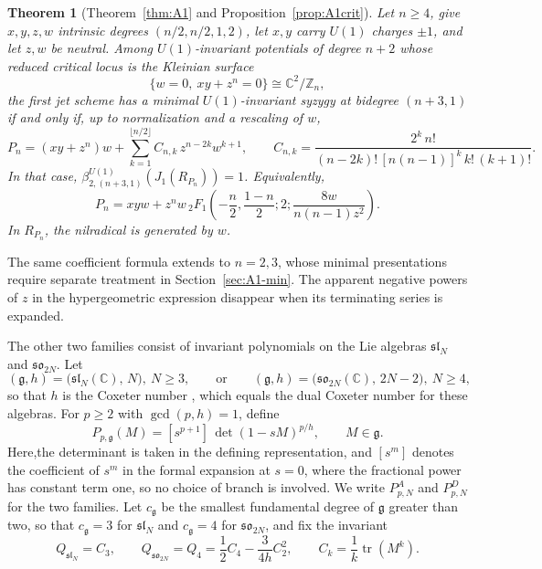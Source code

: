 \documentclass[10pt,reqno]{amsart}
\numberwithin{equation}{section}
\theoremstyle{plain}
\newtheorem{theorem}{Theorem}[section]
\theoremstyle{definition}
\DeclareMathOperator{\tr}{tr}
\begin{document}
\begin{theorem}[Theorem~\ref{thm:A1} and Proposition~\ref{prop:A1crit}]\label{thm:mainA}
Let $n\ge4$, give $x,y,z,w$ intrinsic degrees $(n/2,n/2,1,2)$, let $x,y$ carry $U(1)$ charges $\pm1$, and let $z,w$ be neutral. Among $U(1)$-invariant potentials of degree $n+2$ whose reduced critical locus is the Kleinian surface 
\begin{equation*}
    \{w=0,\ xy+z^n=0\}\cong\mathbb{C}^2/\mathbb{Z}_n, 
\end{equation*}
the first jet scheme has a minimal $U(1)$-invariant syzygy at bidegree $(n+3,1)$ if and only if, up to normalization and a rescaling of $w$,
\begin{equation*}
	P_n=(xy+z^n)w+\sum_{k=1}^{\lfloor n/2\rfloor}C_{n,k}\,z^{n-2k}w^{k+1},\qquad
	C_{n,k}=\frac{2^k\,n!}{(n-2k)!\,[n(n-1)]^k\,k!\,(k+1)!}.
\end{equation*}
In that case, $\beta^{U(1)}_{2,(n+3,1)}(J_1(R_{P_n}))=1$. Equivalently, 
\begin{equation*}
    P_n=xyw+z^nw\,{}_2F_1\left(-\frac n2,\frac{1-n}2;2;\frac{8w}{n(n-1)z^2}\right).
\end{equation*}
In $R_{P_n}$, the nilradical is generated by $w$.
\end{theorem}

The same coefficient formula extends to $n=2,3$, whose minimal presentations require separate treatment in Section~\ref{sec:A1-min}. The apparent negative powers of $z$ in the hypergeometric expression disappear when its terminating series is expanded.

The other two families consist of invariant polynomials on the Lie algebras $\mathfrak{sl}_N$ and $\mathfrak{so}_{2N}$. Let
\begin{equation}\label{eq:introgh}
	(\mathfrak{g},h)=\big(\mathfrak{sl}_N(\mathbb{C}),\,N\big),\ N\ge3,\qquad\text{or}\qquad (\mathfrak{g},h)=\big(\mathfrak{so}_{2N}(\mathbb{C}),\,2N-2\big),\ N\ge4,
\end{equation}
so that $h$ is the Coxeter number \cite{Humphreys}, which equals the dual Coxeter number for these algebras. For $p\ge2$ with $\gcd(p,h)=1$, define
\begin{equation}\label{eq:introP}
	P_{p,\mathfrak{g}}(M)=[s^{p+1}]\,\det(1-sM)^{p/h},\qquad M\in\mathfrak{g}.
\end{equation}
Here,the determinant is taken in the defining representation, and $[s^m]$ denotes the coefficient of $s^m$ in the formal expansion at $s=0$, where the fractional power has constant term one, so no choice of branch is involved. We write $P^A_{p,N}$ and $P^D_{p,N}$ for the two families. Let $c_\mathfrak{g}$ be the smallest fundamental degree of $\mathfrak{g}$ greater than two, so that $c_\mathfrak{g}=3$ for $\mathfrak{sl}_N$ and $c_\mathfrak{g}=4$ for $\mathfrak{so}_{2N}$, and fix the invariant
\begin{equation}\label{eq:introQ}
	Q_{\mathfrak{sl}_N}=C_3,\qquad Q_{\mathfrak{so}_{2N}}=Q_4=\frac12C_4-\frac{3}{4h}C_2^2,\qquad C_k=\frac1k\tr(M^k).
\end{equation}
\end{document}
